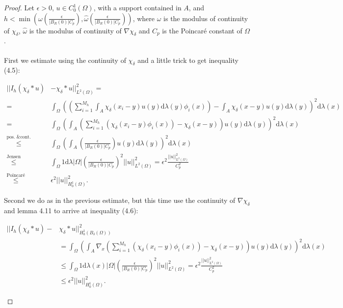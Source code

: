 \documentclass[11pt,a4paper,leqno]{report}
\numberwithin{equation}{chapter}
\begin{document}
\begin{proof}Let $\epsilon>0$, $u\in C^1_0(\Omega)$, with a support contained in $A$, and \\$h<\min(\omega(\frac{\epsilon}{|B_R(0)|C_p}),\hat{\omega}(\frac{\epsilon}{|B_R(0)|C_p}))$, where $\omega$ is the modulus of continuity of $\chi_\delta$, $\widehat{\omega}$ is the modulus of continuity of $\nabla\chi_\delta$ and $C_p$ is the Poincar\'{e} constant of $\Omega$.\\
\\First we estimate using the continuity of $\chi_\delta$ and a little trick to get inequality (4.5):
\begin{small}
\begin{align*}||I_h(\chi_\delta*u)&-\chi_\delta*u||_{L^2(\Omega)}^2=\\
=&\int_{\Omega}((\sum_{i=1}^{M_h}\int_{A}\chi_\delta(x_i-y)u(y)\mathrm{d}\lambda(y)\phi_i(x))-\int_{A}\chi_\delta(x-y)u(y)\mathrm{d}\lambda(y))^2\mathrm{d}\lambda(x)\\
=&\int_{\Omega}(\int_{A}(\sum_{i=1}^{M_h}(\chi_\delta(x_i-y)\phi_i(x))-\chi_\delta(x-y))u(y)\mathrm{d}\lambda(y))^2\mathrm{d}\lambda(x)\\
\overset{\text{pos. \& cont.}}{\leq}&\int_{\Omega}(\int_{A}(\frac{\epsilon}{|B_R(0)|C_p})u(y)\mathrm{d}\lambda(y))^2\mathrm{d}\lambda(x)\\
\overset{\text{Jensen}}{\leq} &\int_{\Omega}1\mathrm{d}\lambda|\Omega|(\frac{\epsilon}{|B_R(0)|C_p})^2||u||_{L^2(\Omega)}^2=\epsilon^2\frac{||u||^2_{L^2(\Omega)}}{C_p^2}\\
\overset{\text{Poincar\'{e}}}{\leq}&\epsilon^2||u||_{H^1_0(\Omega)}^2.
\end{align*}
\end{small}
Second we do as in the previous estimate, but this time use the continuity of $\nabla\chi_\delta$ and lemma 4.11 to arrive at inequality (4.6):
\begin{small}
\begin{align*}
||I_h(\chi_\delta*u)-&\chi_\delta*u||_{H^1_0(B_\delta(\Omega))}^2\\
&=\int_{\Omega}(\int_{A}\nabla_x(\sum_{i=1}^{M_h}(\chi_\delta(x_i-y)\phi_i(x))-\chi_\delta(x-y))u(y)\mathrm{d}\lambda(y))^2\mathrm{d}\lambda(x)\\
&\leq \int_{\Omega}1\mathrm{d}\lambda(x)|\Omega|(\frac{\epsilon}{|B_R(0)|C_p})^2||u||_{L^2(\Omega)}^2=\epsilon^2\frac{||u||^2_{L^2(\Omega)}}{C_p^2}\\
&\leq\epsilon^2||u||_{H^1_0(\Omega)}^2.
\end{align*}
\end{small}
\end{proof}
\end{document}
